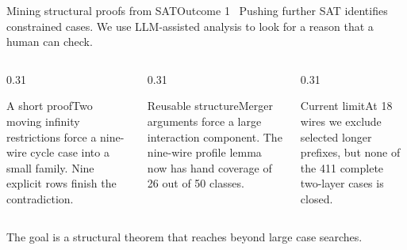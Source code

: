 \documentclass[aspectratio=169,9pt,xcolor=table]{beamer}
\begin{document}
\begin{frame}{Mining structural proofs from SAT}{Outcome 1 \textperiodcentered\ Pushing further}
SAT identifies constrained cases. We use LLM-assisted analysis to look for a reason that a human can check.\par\vspace{0.3cm}
\begin{columns}[T]
\begin{column}{0.31\textwidth}\begin{card}{A short proof}Two moving infinity restrictions force a nine-wire cycle case into a small family. Nine explicit rows finish the contradiction.\end{card}\end{column}
\begin{column}{0.31\textwidth}\begin{card}{Reusable structure}Merger arguments force a large interaction component. The nine-wire profile lemma now has hand coverage of 26 out of 50 classes.\end{card}\end{column}
\begin{column}{0.31\textwidth}\begin{card}[rust]{Current limit}At 18 wires we exclude selected longer prefixes, but none of the 411 complete two-layer cases is closed.\end{card}\end{column}
\end{columns}
\vspace{0.3cm}
{\color{navy}The goal is a structural theorem that reaches beyond large case searches.}
\end{frame}
\end{document}
